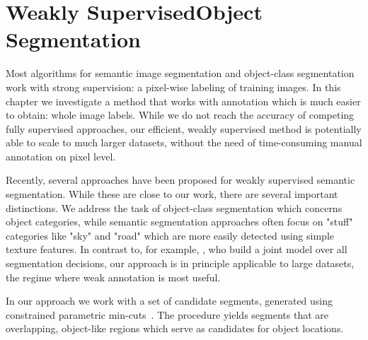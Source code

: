 \chapter[Weakly Supervised Object Segmentation]{Weakly Supervised\linebreak Object Segmentation}\label{ch:semi_supervised}

Most algorithms for semantic image segmentation and object-class segmentation
work with strong supervision: a pixel-wise labeling of training images. In this
chapter we investigate a method that works with annotation which is much
easier to obtain: whole image labels.
While we do not reach the accuracy of competing fully supervised approaches,
our efficient, weakly supervised method is potentially able to scale to much
larger datasets, without the need of time-consuming manual annotation on
pixel level.

Recently, several approaches have been proposed for weakly supervised semantic
segmentation.  While these are close to our work, there are several important
distinctions.  We address the task of object-class segmentation which concerns
object categories, while semantic segmentation approaches often focus on
"stuff" categories like "sky" and "road" which are more easily detected using
simple texture features.
In contrast to, for example, \citet{vezhnevets2011weakly}, who build a joint model over all
segmentation decisions, our approach is in
principle applicable to large datasets, the regime where weak annotation is
most useful.

In our approach we work with a set of candidate segments, generated using
constrained parametric min-cuts~\citep{carreira2010constrained}.  The procedure yields
segments that are overlapping, object-like regions which serve as candidates
for object locations.

